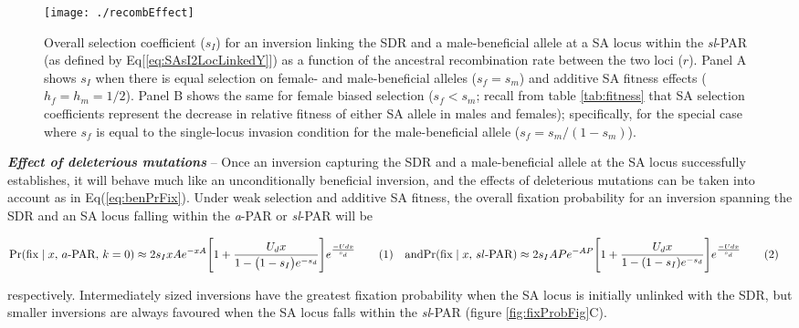 \documentclass{article}
\newcommand\numberthis{\addtocounter{equation}{1}\tag{\theequation}}
\begin{document}
 \begin{figure}[!htbp]
 \centering
 \texttt{[image: ./recombEffect]}
 \caption{Overall selection coefficient ($s_I$) for an inversion linking the SDR and a male-beneficial allele at a SA locus within the {\itshape sl}-PAR (as defined by Eq[\ref{eq:SAsI2LocLinkedY}]) as a function of the ancestral recombination rate between the two loci ($r$). Panel A shows $s_I$ when there is equal selection on female- and male-beneficial alleles ($s_f = s_m$) and additive SA fitness effects ($h_f = h_m = 1/2$). Panel B shows the same for female biased selection ($s_f < s_m$; recall from table \ref{tab:fitness} that SA selection coefficients represent the decrease in relative fitness of either SA allele in males and females); specifically, for the special case where $s_f$ is equal to the single-locus invasion condition for the male-beneficial allele ($s_f = s_m / (1 - s_m)$).}
 \label{fig:recombEffect}
 \end{figure}


{\bf \itshape Effect of deleterious mutations} -- Once an inversion capturing the SDR and a male-beneficial allele at the SA locus successfully establishes, it will behave much like an unconditionally beneficial inversion, and the effects of deleterious mutations can be taken into account as in Eq(\ref{eq:benPrFix}). Under weak selection and additive SA fitness, the overall fixation probability for an inversion spanning the SDR and an SA locus falling within the {\itshape a}-PAR or {\itshape sl}-PAR will be 


\begin{subequations}\label{eq:SAPfixWithDel}
	\begin{align*}
	\Pr (\text{fix} \mid x,\,a\text{-PAR},\, k=0) &\approx 2 s_I x A e^{-xA} \Bigg[1 + \frac{U_d x}{1 - \big(1 - s_I \big) e^{-s_d}} \Bigg]e^{\frac{-Ud x}{s_d}} \numberthis
	\end{align*}
	\text{and}
	\begin{align*}
	\Pr (\text{fix} \mid x,\,sl\text{-PAR}) &\approx 2 s_I A P e^{-A P} \Bigg[1 + \frac{U_d x}{1 - (1 - s_I) e^{-s_d}} \Bigg]e^{\frac{-Ud x}{s_d}} \numberthis
	\end{align*}
\end{subequations}

\noindent respectively. Intermediately sized inversions have the greatest fixation probability when the SA locus is initially unlinked with the SDR, but smaller inversions are always favoured when the SA locus falls within the {\itshape sl}-PAR (figure \ref{fig:fixProbFig}C). \vspace{12pt}
\end{document}
